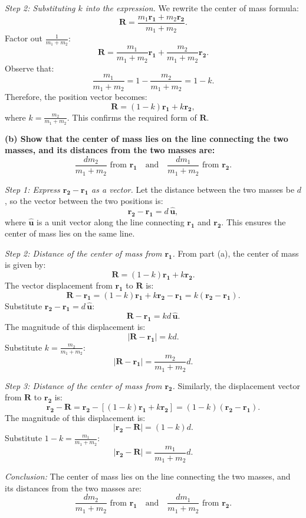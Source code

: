 \documentclass{article}
\begin{document}
\textit{Step 2: Substituting $k$ into the expression.}  
We rewrite the center of mass formula:
\[
\mathbf{R} = \frac{m_1 \mathbf{r_1} + m_2 \mathbf{r_2}}{m_1 + m_2}.
\]
Factor out $\frac{1}{m_1 + m_2}$:
\[
\mathbf{R} = \frac{m_1}{m_1 + m_2} \mathbf{r_1} + \frac{m_2}{m_1 + m_2} \mathbf{r_2}.
\]
Observe that:
\[
\frac{m_1}{m_1 + m_2} = 1 - \frac{m_2}{m_1 + m_2} = 1 - k.
\]
Therefore, the position vector becomes:
\[
\mathbf{R} = (1 - k)\mathbf{r_1} + k\mathbf{r_2},
\]
where $k = \frac{m_2}{m_1 + m_2}$. This confirms the required form of $\mathbf{R}$.

\vspace{0.5cm}
\textbf{(b) Show that the center of mass lies on the line connecting the two masses, and its distances from the two masses are:}
\[
\frac{d m_2}{m_1 + m_2} \text{ from } \mathbf{r_1} \quad \text{and} \quad \frac{d m_1}{m_1 + m_2} \text{ from } \mathbf{r_2}.
\]

\textit{Step 1: Express $\mathbf{r_2} - \mathbf{r_1}$ as a vector.}  
Let the distance between the two masses be $d$, so the vector between the two positions is:
\[
\mathbf{r_2} - \mathbf{r_1} = d \, \hat{\mathbf{u}},
\]
where $\hat{\mathbf{u}}$ is a unit vector along the line connecting $\mathbf{r_1}$ and $\mathbf{r_2}$. This ensures the center of mass lies on the same line.

\textit{Step 2: Distance of the center of mass from $\mathbf{r_1}$.}  
From part (a), the center of mass is given by:
\[
\mathbf{R} = (1 - k)\mathbf{r_1} + k\mathbf{r_2}.
\]
The vector displacement from $\mathbf{r_1}$ to $\mathbf{R}$ is:
\[
\mathbf{R} - \mathbf{r_1} = (1 - k)\mathbf{r_1} + k\mathbf{r_2} - \mathbf{r_1} = k(\mathbf{r_2} - \mathbf{r_1}).
\]
Substitute $\mathbf{r_2} - \mathbf{r_1} = d \, \hat{\mathbf{u}}$:
\[
\mathbf{R} - \mathbf{r_1} = k d \, \hat{\mathbf{u}}.
\]
The magnitude of this displacement is:
\[
|\mathbf{R} - \mathbf{r_1}| = k d.
\]
Substitute $k = \frac{m_2}{m_1 + m_2}$:
\[
|\mathbf{R} - \mathbf{r_1}| = \frac{m_2}{m_1 + m_2} d.
\]

\textit{Step 3: Distance of the center of mass from $\mathbf{r_2}$.}  
Similarly, the displacement vector from $\mathbf{R}$ to $\mathbf{r_2}$ is:
\[
\mathbf{r_2} - \mathbf{R} = \mathbf{r_2} - \left[(1 - k)\mathbf{r_1} + k\mathbf{r_2}\right] = (1 - k)(\mathbf{r_2} - \mathbf{r_1}).
\]
The magnitude of this displacement is:
\[
|\mathbf{r_2} - \mathbf{R}| = (1 - k)d.
\]
Substitute $1 - k = \frac{m_1}{m_1 + m_2}$:
\[
|\mathbf{r_2} - \mathbf{R}| = \frac{m_1}{m_1 + m_2} d.
\]

\textit{Conclusion:}  
The center of mass lies on the line connecting the two masses, and its distances from the two masses are:
\[
\frac{d m_2}{m_1 + m_2} \text{ from } \mathbf{r_1} \quad \text{and} \quad \frac{d m_1}{m_1 + m_2} \text{ from } \mathbf{r_2}.
\]
\end{document}
